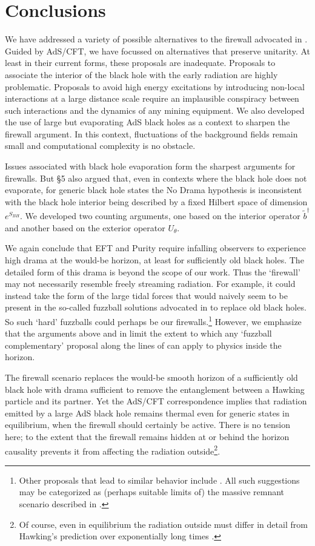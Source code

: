 \documentclass[12pt]{article}
\newcommand{\sect}[1]{\section{#1}\setcounter{equation}{0}}
\begin{document}
{\sect{Conclusions}

We have addressed a variety of possible alternatives to the firewall advocated in \cite{Almheiri:2012rt}.
Guided by AdS/CFT, we have focussed on alternatives that preserve unitarity.  At least in their current forms, these proposals are inadequate.  Proposals to associate the interior of the black hole with the early radiation are highly problematic. Proposals to avoid high energy excitations by introducing non-local interactions at a large distance scale require an implausible conspiracy between such interactions and the dynamics of any mining equipment. We also developed the use of large but evaporating AdS black holes as a context to sharpen the firewall argument.  In this context, fluctuations of the background fields remain small and computational complexity is no obstacle.

Issues associated with black hole evaporation form the sharpest arguments for firewalls.  But \S5 also argued that, even in contexts where the black hole does not evaporate, for generic black hole states the No Drama hypothesis is inconsistent with the black hole interior being described by a fixed Hilbert space of dimension $e^{S_{BH}}$.  We developed two counting arguments, one based on the interior operator $\tilde b^\dagger$ and another based on the exterior operator $U_\theta$.

We again conclude that EFT and Purity require infalling observers to experience high drama at the would-be horizon, at least for sufficiently old black holes.  The detailed form of this drama is beyond the scope of our work.  Thus the `firewall' may not necessarily resemble freely streaming radiation.  For example, it could instead take the form of the large tidal forces that would naively seem to be present in the so-called fuzzball solutions advocated in {\cite{Mathur:2009hf}}
 to replace old black holes.   So such `hard' fuzzballs could perhaps be our firewalls.\footnote{Other proposals that lead to similar behavior include \cite{Chapline:2000en,Mazur:2001fv,Winterberg,Davidson:2011eu,Giveon:2012kp}.  All such suggestions may be categorized as (perhaps suitable limits of) the massive remnant scenario described in \cite{Giddings:1992hh}.}  However, we emphasize that {the arguments above and in \cite{Almheiri:2012rt} limit the extent to which any `fuzzball complementary' proposal along the lines of {\cite{Mathur:2012jk}} can apply to physics inside the horizon.}

The firewall scenario replaces the would-be smooth horizon of a sufficiently old black hole with drama sufficient to remove the entanglement between a Hawking particle and its partner.  Yet the AdS/CFT correspondence implies that radiation emitted by a large AdS black hole remains thermal even for generic states in equilibrium, when the firewall should certainly be active. There is no tension here; to the extent that the firewall remains hidden at or behind the horizon causality prevents it from affecting the radiation outside\footnote{Of course, even in equilibrium the radiation outside must differ in detail from Hawking's prediction over exponentially long times \cite{Maldacena:2001kr}.}.

}
\end{document}
